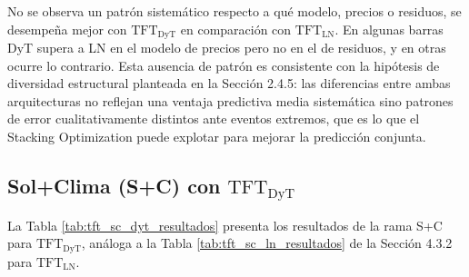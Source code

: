 No se observa un patrón sistemático respecto a qué modelo, precios o residuos, se desempeña mejor con $\text{TFT}_\text{DyT}$ en comparación con $\text{TFT}_\text{LN}$. En algunas barras DyT supera a LN en el modelo de precios pero no en el de residuos, y en otras ocurre lo contrario. Esta ausencia de patrón es consistente con la hipótesis de diversidad estructural planteada en la Sección 2.4.5: las diferencias entre ambas arquitecturas no reflejan una ventaja predictiva media sistemática sino patrones de error cualitativamente distintos ante eventos extremos, que es lo que el Stacking Optimization puede explotar para mejorar la predicción conjunta.

\subsection{Sol+Clima (S+C) con \texorpdfstring{$\text{TFT}_\text{DyT}$}{TFT DyT}}

La Tabla \ref{tab:tft_sc_dyt_resultados} presenta los resultados de la rama S+C para $\text{TFT}_\text{DyT}$, análoga a la Tabla \ref{tab:tft_sc_ln_resultados} de la Sección 4.3.2 para $\text{TFT}_\text{LN}$.

